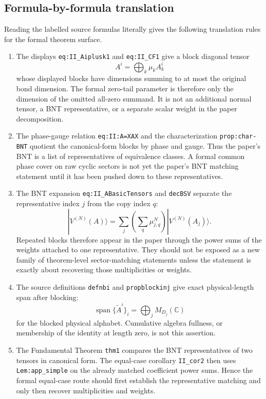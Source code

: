 \documentclass{article}
\begin{document}
\subsection{Formula-by-formula translation}

Reading the labelled source formulas literally gives the following translation
rules for the formal theorem surface.

\begin{enumerate}
  \item The displays \texttt{eq:II\_Aiplusk1} and \texttt{eq:II\_CF1} give a
  block diagonal tensor
  \[
    A^i=\bigoplus_k \mu_k A_k^i
  \]
  whose displayed blocks have dimensions summing to at most the original bond
  dimension. The formal zero-tail parameter is therefore only the dimension of
  the omitted all-zero summand. It is not an additional normal tensor, a BNT
  representative, or a separate scalar weight in the paper decomposition.

  \item The phase-gauge relation \texttt{eq:II:A=XAX}
  \cite[lines~264--268]{Cirac2016MPDO_arXiv} and the characterization
  \texttt{prop:char-BNT}
  \cite[lines~278--280 and 1135--1148]{Cirac2016MPDO_arXiv} quotient the
  canonical-form blocks by phase and gauge.
  Thus the paper's BNT is a list of representatives of equivalence classes.
  A formal common phase cover on raw cyclic sectors is not yet the paper's BNT
  matching statement until it has been pushed down to these representatives.

  \item The BNT expansion \texttt{eq:II\_ABasicTensors} and \texttt{decBSV}
  separate the representative index $j$ from the copy index $q$:
  \[
    |V^{(N)}(A)\rangle
      =
    \sum_j\left(\sum_q\mu_{j,q}^N\right)|V^{(N)}(A_j)\rangle.
  \]
  Repeated blocks therefore appear in the paper through the power sums of the
  weights attached to one representative. They should not be exposed as a new
  family of theorem-level sector-matching statements unless the statement is
  exactly about recovering those multiplicities or weights.

  \item The source definitions \texttt{defnbi} and \texttt{propblockinj} give
  exact physical-length span after blocking:
  \[
    \operatorname{span}\{\tilde A^i\}_i
      =
    \bigoplus_j M_{D_j}(\mathbb C)
  \]
  for the blocked physical alphabet. Cumulative algebra fullness, or
  membership of the identity at length zero, is not this assertion.

  \item The Fundamental Theorem \texttt{thm1} compares the BNT representatives
  of two tensors in canonical form. The equal-case corollary \texttt{II\_cor2}
  then uses \texttt{Lem:app\_simple} on the already matched coefficient power
  sums. Hence the formal equal-case route should first establish the
  representative matching and only then recover multiplicities and weights.
\end{enumerate}
\end{document}
